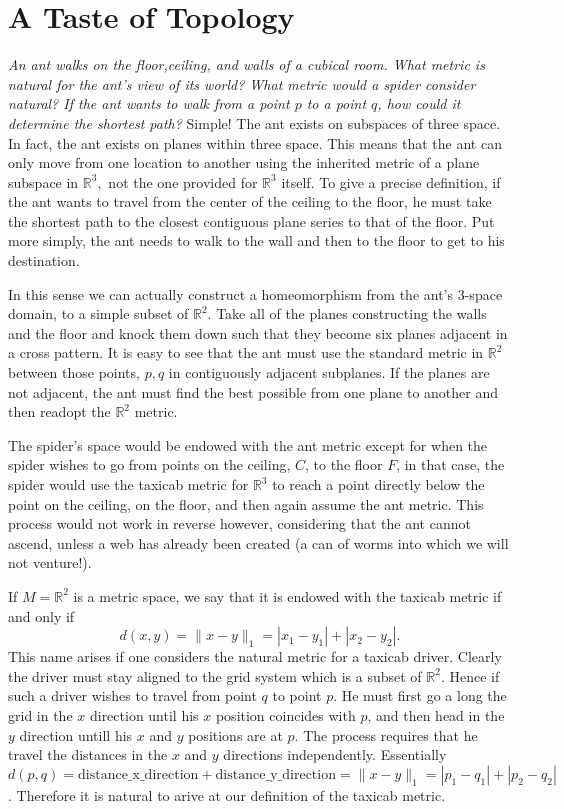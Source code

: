 \documentclass[letter]{article}
\newenvironment{menumerate}{%
  \edef\backupindent{\the\parindent}%
  \enumerate%
  \setlength{\parindent}{\backupindent}%
}{\endenumerate}
\begin{document}
\section{A Taste of Topology}
\begin{menumerate}
	\item \textit{An ant walks on the floor,ceiling, and walls of a cubical room. What metric is natural for the ant's view of its world? What metric would a spider consider natural? If the ant wants to walk from a point $p$ to a point $q$, how could it determine the shortest path?} Simple! The ant exists on subspaces of three space. In fact, the ant exists on planes within three space. This means that the ant can only move from one location to another using the inherited metric of a plane subspace in $\mathbb{R}^3,$ not the one provided for $\mathbb{R}^3$ itself. To give a precise definition, if the ant wants to travel from the center of the ceiling to the floor, he must take the shortest path to the closest contiguous plane series to that of the floor. Put more simply, the ant needs to walk to the wall and then to the floor to get to his destination.

	 In this sense we can actually construct a homeomorphism from the ant's $3$-space domain, to a simple subset of $\mathbb{R}^2.$ Take all of the planes constructing the walls and the floor and knock them down such that they become six planes adjacent in a cross pattern. It is easy to see that the ant must use the standard metric in $\mathbb{R}^2$ between those points, $p,q$ in contiguously adjacent subplanes. If the planes are not adjacent, the ant must find the best possible from one plane to another and then readopt the $\mathbb{R}^2$ metric.

	 The spider's space would be endowed with the ant metric except for when the spider wishes to go from points on the ceiling, $C$, to the floor $F$, in that case, the spider would use the taxicab metric for $\mathbb{R}^3$ to reach a point directly below the point on the ceiling, on the floor, and then again assume the ant metric. This process would not work in reverse however, considering that the ant cannot ascend, unless a web has already been created (a can of worms into which we will not venture!).

	 \item If $M = \mathbb{R}^2$ is a metric space, we say that it is endowed with the taxicab metric if and only if $$d(x,y)=\|x-y\|_1=|x_1 - y_1| + |x_2 - y_2|.$$ This name arises if one considers the natural metric for a taxicab driver. Clearly the driver must stay aligned to the grid system which is a subset of $\mathbb{R}^2$. Hence if such a driver wishes to travel from point $q$ to point $p$. He must first go a long the grid in the $x$ direction until his $x$ position coincides with $p$, and then head in the $y$ direction untill his $x$ and $y$ positions are at $p$. The process requires that he travel the distances in the $x$ and $y$ directions independently. Essentially $d(p,q) = \mathrm{distance\_x\_direction} + \mathrm{distance\_y\_direction} =\|x-y\|_1=|p_1 - q_1| + |p_2 - q_2|$. Therefore it is natural to arive at our definition of the taxicab metric.


\end{menumerate}
\end{document}
